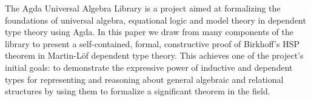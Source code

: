 The Agda Universal Algebra Library is a project aimed at formalizing the foundations of
universal algebra, equational logic and model theory in dependent type theory
using Agda. In this paper we draw from many components of the library to present
a self-contained, formal, constructive proof of Birkhoff's HSP theorem in
Martin-L\"of dependent type theory.
This achieves one of the project's initial goals: to demonstrate the expressive power of
inductive and dependent types for representing and reasoning about general
algebraic and relational structures by using them to formalize a significant theorem in the field.
